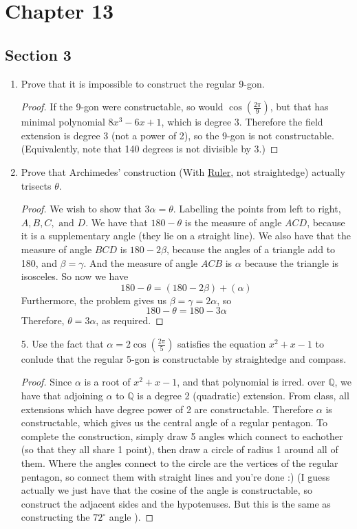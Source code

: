 \documentclass[hidelinks,12pt]{article}
\title{\scalebox{1.5}{Math 835 Homework 3}}
\author{\scalebox{1.5}{Theo Koss}}
\date{September 2024}
\newcommand{\Q}{\mathbb{Q}}
\begin{document}
\maketitle
\section*{Chapter 13}
\subsection*{Section 3}
\begin{enumerate}
    \item Prove that it is impossible to construct the regular 9-gon.
        \begin{proof}
            If the 9-gon were constructable, so would \(\cos(\frac{2\pi}{9})\), but that has minimal polynomial \(8x^{3}-6x+1\), which is degree 3. Therefore the field extension is degree 3 (not a power of 2), so the 9-gon is not constructable. (Equivalently, note that 140 degrees is not divisible by 3.)
        \end{proof}
    \item Prove that Archimedes' construction (With \underline{Ruler}, not straightedge) actually trisects \(\theta\).
        \begin{proof}
            We wish to show that \(3\alpha=\theta\). Labelling the points from left to right, \(A,B,C,\text{ and }D\). We have that \(180-\theta\) is the measure of angle \(ACD\), because it is a supplementary angle (they lie on a straight line). We also have that the measure of angle \(BCD\) is \(180-2\beta\), because the angles of a triangle add to 180, and \(\beta=\gamma\). And the measure of angle \(ACB\) is \(\alpha\) because the triangle is isosceles. So now we have
            \[
                180-\theta=(180-2\beta)+(\alpha)
            \]
            Furthermore, the problem gives us \(\beta=\gamma=2 \alpha\), so \[
            180-\theta=180-3 \alpha
            \]
            Therefore, \(\theta=3 \alpha\), as required. 
        \end{proof}
    \item[5.] Use the fact that \(\alpha=2\cos(\frac{2\pi}{5})\) satisfies the equation \(x^{2}+x-1\) to conlude that the regular 5-gon is constructable by straightedge and compass.
        \begin{proof}
            Since \(\alpha\) is a root of \(x^{2}+x-1\), and that polynomial is irred. over \(\Q\), we have that adjoining \(\alpha\) to \(\Q\) is a degree 2 (quadratic) extension. From class, all extensions which have degree power of 2 are constructable. Therefore \(\alpha\) is constructable, which gives us the central angle of a regular pentagon. To complete the construction, simply draw 5 angles which connect to eachother (so that they all share 1 point), then draw a circle of radius 1 around all of them. Where the angles connect to the circle are the vertices of the regular pentagon, so connect them with straight lines and you're done :) (I guess actually we just have that the cosine of the angle is constructable, so construct the adjacent sides and the hypotenuses. But this is the same as constructing the \( 72^{\circ}\) angle ).
        \end{proof}
\end{enumerate}
\end{document}
